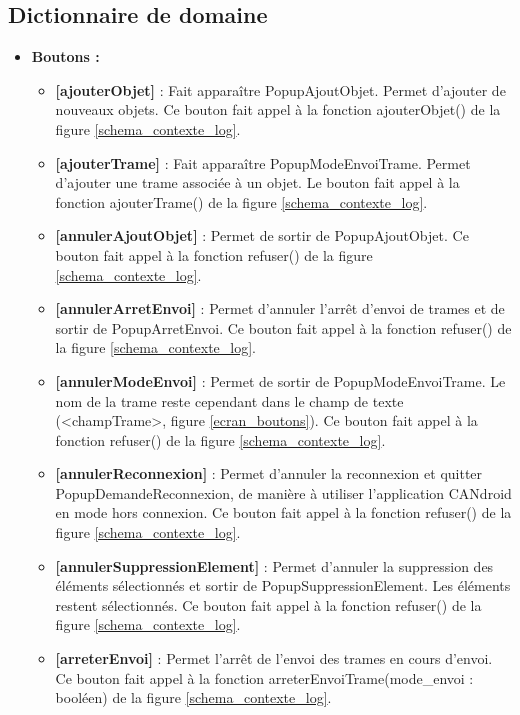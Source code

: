 \subsection{Dictionnaire de domaine} \label{dictionnaire}

\begin{itemize}  
    \item \textbf{Boutons :}
        \begin{itemize}
            \item \textbf{[ajouterObjet]} : Fait apparaître PopupAjoutObjet. Permet d'ajouter de nouveaux objets. Ce bouton fait appel à la fonction ajouterObjet() de la figure \ref{schema_contexte_log}.
            \item \textbf{[ajouterTrame]} : Fait apparaître PopupModeEnvoiTrame. Permet d'ajouter une trame associée à un objet. Le bouton fait appel à la fonction ajouterTrame() de la figure \ref{schema_contexte_log}.
            \item \textbf{[annulerAjoutObjet]} :  Permet de sortir de PopupAjoutObjet. Ce bouton fait appel à la fonction refuser() de la figure \ref{schema_contexte_log}.
            \item \textbf{[annulerArretEnvoi]} : Permet d'annuler l'arrêt d'envoi de trames et de sortir de PopupArretEnvoi. Ce bouton fait appel à la fonction refuser() de la figure \ref{schema_contexte_log}.
            \item \textbf{[annulerModeEnvoi]} : Permet de sortir de PopupModeEnvoiTrame. Le nom de la trame reste cependant dans le champ de texte (<champTrame>, figure \ref{ecran_boutons}). Ce bouton fait appel à la fonction refuser() de la figure \ref{schema_contexte_log}.
            \item \textbf{[annulerReconnexion]} : Permet d'annuler la reconnexion et quitter PopupDemandeReconnexion, de manière à utiliser l'application CANdroid en mode hors connexion. Ce bouton fait appel à la fonction refuser() de la figure \ref{schema_contexte_log}.
            \item \textbf{[annulerSuppressionElement]} : Permet d'annuler la suppression des éléments sélectionnés et sortir de PopupSuppressionElement. Les éléments restent sélectionnés. Ce bouton fait appel à la fonction refuser() de la figure \ref{schema_contexte_log}.
            \item \textbf{[arreterEnvoi]} : Permet l'arrêt de l'envoi des trames en cours d'envoi. Ce bouton fait appel à la fonction arreterEnvoiTrame(mode\_envoi : booléen) de la figure \ref{schema_contexte_log}.

\end{itemize}
\end{itemize}
